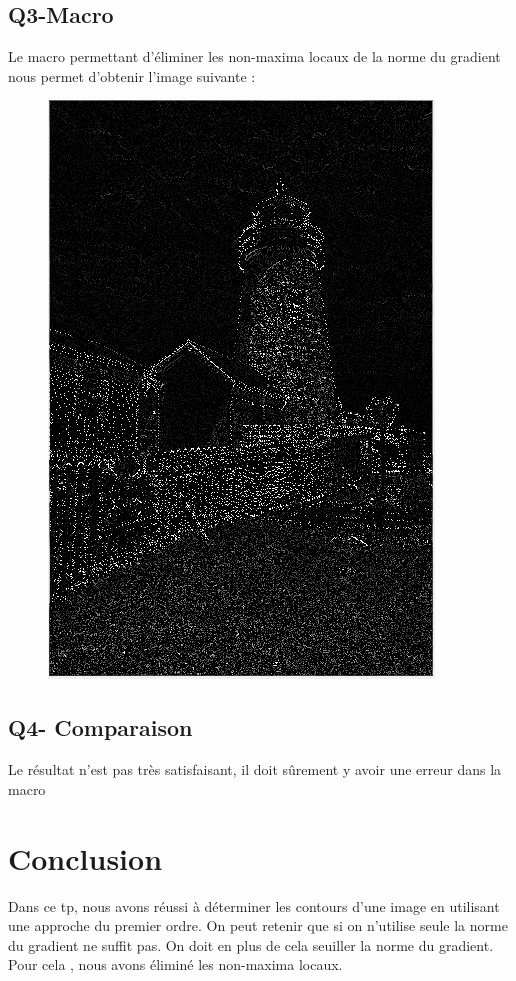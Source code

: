 \documentclass[a4paper,12pt]{report}
\begin{document}
\subsection*{Q3-Macro}
Le macro  permettant d'éliminer les non-maxima locaux de la norme du gradient nous permet d'obtenir l'image suivante :
\begin{figure}[!ht]
	\center
	\includegraphics[scale=0.4]{./imageResultats/maxima.png}
\end{figure}
\subsection*{Q4- Comparaison}
Le résultat n'est pas très satisfaisant, il doit sûrement y avoir une erreur dans la macro
\section*{Conclusion}
Dans ce tp, nous avons réussi à déterminer les contours d'une image en utilisant une approche du premier ordre. On peut retenir que si on n'utilise seule la norme du gradient ne suffit pas. On doit en plus de cela seuiller la norme du gradient. Pour cela , nous avons éliminé les non-maxima locaux.
\end{document}

